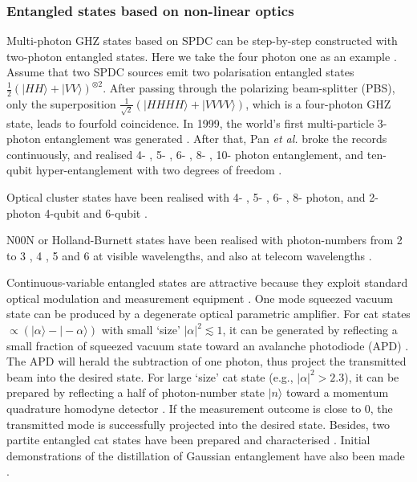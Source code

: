 \documentclass[aps, rmp, twocolumn, amsmath, amssymb, nofootinbib, superscriptaddress, longbibliography, floatfix, table-of-contents, eqsecnum]{revtex4-1}
\newcommand{\ket}[1]{|#1\rangle}
\begin{document}
\subsubsection{Entangled states based on non-linear optics} 

Multi-photon GHZ states based on SPDC \cite{kwiat1995new} can be step-by-step constructed with two-photon entangled states. Here we take the four photon one as an example \cite{pan2012multiphoton}. Assume that two SPDC sources emit two polarisation entangled states \mbox{$\frac{1}{2}(\ket{HH} + \ket{VV})^{\otimes 2}$}. After passing through the polarizing beam-splitter (PBS), only the superposition \mbox{$\frac{1}{\sqrt{2}}(\ket{HHHH} + \ket{VVVV})$}, which is a four-photon GHZ state, leads to fourfold coincidence. In 1999, the world's first multi-particle 3-photon entanglement was generated \cite{bouwmeester1999observation, pan2000experimental}. After that, Pan \textit{et al.} broke the records continuously, and realised 4- \cite{zhao2003experimental}, 5- \cite{zhao2004experimental}, 6- \cite{lu2007experimental}, 8- \cite{yao2012observation}, 10- \cite{bib:tenPhotEnt} photon entanglement, and ten-qubit hyper-entanglement with two degrees of freedom \cite{gao2010experimental}.

Optical cluster states have been realised with 4- \cite{walther2005experimental}, 5- \cite{lu2008experimental}, 6- \cite{lu2007experimental}, 8- \cite{yao2012experimental} photon, and 2-photon 4-qubit \cite{chen2007experimental} and 6-qubit \cite{ceccarelli2009experimental}.

N00N or Holland-Burnett states have been realised with photon-numbers from 2 \cite{edamatsu2002measurement} to 3 \cite{mitchell2004super}, 4 \cite{walther2004broglie, nagata2007beating, matthews2011heralding}, 5 \cite{afek2010high} and 6 \cite{xiang2012optimal} at visible wavelengths, and also at telecom wavelengths \cite{yabuno2012four, bisht2015spectral, jin2016detection}.

Continuous-variable entangled states are attractive because they exploit standard optical modulation and measurement equipment \cite{ralph2009bright}. One mode squeezed vacuum state can be produced by a degenerate optical parametric amplifier. For cat states \mbox{$\propto(\ket{\alpha} - \ket{-\alpha})$} with small `size' \mbox{$|\alpha|^2 \lesssim 1$}, it can be generated by reflecting a small fraction of squeezed vacuum state toward an avalanche photodiode (APD) \cite{neergaard2006generation, ourjoumtsev2006generating, wakui2007photon}. The APD will herald the subtraction of one photon, thus project the transmitted beam into the desired state. For large `size' cat state (e.g., \mbox{$|\alpha|^2 > 2.3$}), it can be prepared by reflecting a half of photon-number state $\ket{n}$ toward a momentum quadrature homodyne detector \cite{ourjoumtsev2007generation,takahashi2008generation}. If the measurement outcome is close to 0, the transmitted mode is successfully projected into the desired state. Besides, two partite entangled cat states have been prepared and characterised \cite{ourjoumtsev2009preparation}. Initial demonstrations of the distillation of Gaussian entanglement have also been made \cite{takahashi2010entanglement, xiang2010heralded}.
\end{document}
